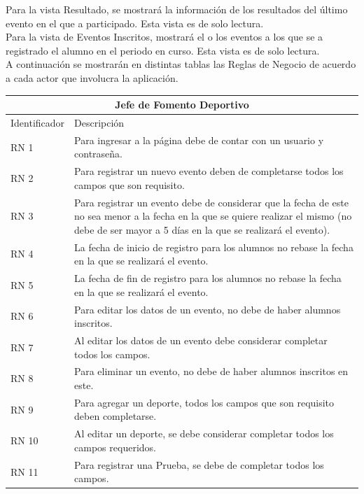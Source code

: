 Para la vista Resultado, se mostrará la información de los resultados del último evento en el que a participado. Esta vista es de solo lectura.\\

Para la vista de Eventos Inscritos, mostrará el o los eventos a los que se a registrado el alumno en el periodo en curso. Esta vista es de solo lectura.\\

\noindent A continuación se mostrarán en distintas tablas las Reglas de Negocio de acuerdo a cada actor que involucra la aplicación.

\begin{table}[hbt!]
	\begin{center}
		\begin{tabular}{|p{30mm}|p{100mm}|}
			\hline
			\multicolumn{2}{|c|}{Jefe de Fomento Deportivo} \\
			\hline
			Identificador & Descripción \\
			\hline 
			RN 1 & Para ingresar a la página debe de contar con un usuario y contraseña. \\ \hline
			RN 2 &  Para registrar un nuevo evento deben de completarse todos los campos que son requisito.\\ \hline
			RN 3 & Para registrar un evento debe de considerar que la fecha de este no sea menor a la fecha en la que se quiere realizar el mismo (no debe de ser mayor  a 5 días en la que se realizará el evento). \\ \hline
			RN 4 &  La fecha de inicio de registro para los alumnos no rebase la fecha en la que se realizará el evento.\\ \hline
			RN 5 &  La fecha de fin de registro para los alumnos no rebase la fecha en la que se realizará el evento. \\ \hline
			RN 6 & Para editar los datos de un evento, no debe de haber alumnos inscritos. \\ \hline
			RN 7 &  Al editar los datos de un evento debe considerar completar todos los campos.\\ \hline
			RN 8 &  Para eliminar un evento, no debe de haber alumnos inscritos en este.\\ \hline
			RN 9 &  Para agregar un deporte, todos los campos que son requisito deben completarse.\\ \hline
			RN 10 &  Al editar un deporte, se debe considerar completar todos los campos requeridos.\\ \hline
			RN 11 &  Para registrar una Prueba, se debe de completar todos los campos.\\ \hline

\end{tabular}
\end{center}
\end{table}
